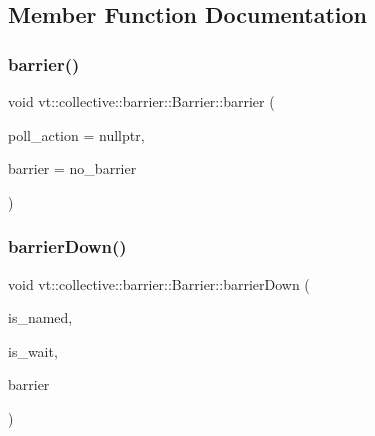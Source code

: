 \subsection{Member Function Documentation}
\mbox{\label{structvt_1_1collective_1_1barrier_1_1_barrier_a05124050c7d353a4f3475ee1875dd46a}} 
\subsubsection{\texorpdfstring{barrier()}{barrier()}}
{\footnotesize\ttfamily void vt\+::collective\+::barrier\+::\+Barrier\+::barrier (\begin{DoxyParamCaption}\item[{\hyperlink{namespacevt_ae0a5a7b18cc99d7b732cb4d44f46b0f3}{Action\+Type}}]{poll\+\_\+action = {\ttfamily nullptr},  }\item[{\hyperlink{namespacevt_a25e481f0d6bbc7204db23d1c87a62e77}{Barrier\+Type} const \&}]{barrier = {\ttfamily no\+\_\+barrier} }\end{DoxyParamCaption})\hspace{0.3cm}{\ttfamily [inline]}}

\mbox{\label{structvt_1_1collective_1_1barrier_1_1_barrier_a962a1cbd78c359e1dee7a8e7df5cfd75}} 
\subsubsection{\texorpdfstring{barrier\+Down()}{barrierDown()}\hspace{0.1cm}{\footnotesize\ttfamily [1/2]}}
{\footnotesize\ttfamily void vt\+::collective\+::barrier\+::\+Barrier\+::barrier\+Down (\begin{DoxyParamCaption}\item[{bool const \&}]{is\+\_\+named,  }\item[{bool const \&}]{is\+\_\+wait,  }\item[{\hyperlink{namespacevt_a25e481f0d6bbc7204db23d1c87a62e77}{Barrier\+Type} const \&}]{barrier }\end{DoxyParamCaption})}

